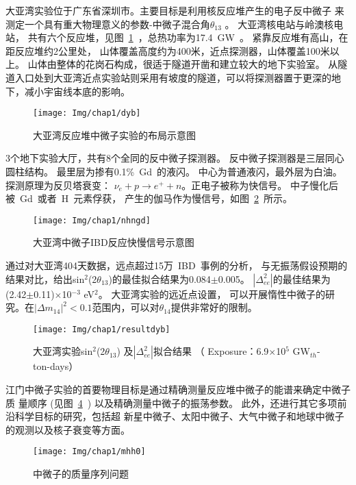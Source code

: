 大亚湾实验位于广东省深圳市。主要目标是利用核反应堆产生的电子反中微子
来测定一个具有重大物理意义的参数-中微子混合角$\theta_{13}$
\citep{pontecorvo1968neutrino,maki1962remarks}。
大亚湾核电站与岭澳核电站，
共有六个反应堆，见图~\ref{fig:dyb}~，总热功率为17.4~GW~。
紧靠反应堆有高山，在距反应堆约2公里处，
山体覆盖高度约为400米，近点探测器，山体覆盖100米以上。
山体由整体的花岗石构成，很适于隧道开凿和建立较大的地下实验室。
从隧道入口处到大亚湾近点实验站则采用有坡度的隧道，可以将探测器置于更深的地下，减小宇宙线本底的影响。
\begin{figure}[!htb]
  \centering
   \texttt{[image: Img/chap1/dyb]}
    \caption{大亚湾反应堆中微子实验的布局示意图}
  \label{fig:dyb}
\end{figure}
3个地下实验大厅，共有8个全同的反中微子探测器。
反中微子探测器是三层同心圆柱结构\citep{an2012side}。
最里层为掺有0.1\%~Gd~的液闪\citep{yeh2007gadolinium}。
中心为普通液闪，最外层为白油。探测原理为反贝塔衰变：
$\nu_e + p \rightarrow e^+ + n $。正电子被称为快信号。
中子慢化后被~Gd~\citep{an2015new}或者~H~元素\citep{an2014independent}俘获，
产生的伽马作为慢信号，如图~\ref{fig:nhngd}~所示。
\begin{figure}[!htb]
  \centering
   \texttt{[image: Img/chap1/nhngd]}
    \caption{大亚湾中微子IBD反应快慢信号示意图}
  \label{fig:nhngd}
\end{figure}
通过对大亚湾404天数据，远点超过15万~IBD~事例的分析，
与无振荡假设预期的结果对比，给出sin$^2$(2$\theta_{13}$)的最佳拟合结果为0.084$\pm$0.005。
$|\Delta^2_{ee}|$的最佳结果为 (2.42$\pm$0.11)$\times$10$^{-3}$ eV$^2$。
大亚湾实验的远近点设置，
可以开展惰性中微子的研究\citep{an2014search}。在${|\Delta m_{14}|}^2<0.1$范围内，可以对$\theta_{14}$提供非常好的限制。
\begin{figure}[!htb]
  \centering
   \texttt{[image: Img/chap1/resultdyb]}
    \caption{大亚湾实验sin$^2$(2$\theta_{13}$) 及$|\Delta^2_{ee}|$拟合结果 （ Exposure：6.9$\times$10$^5$ GW$_{th}$-ton-days） }
  \label{fig:resultdyb}
\end{figure}
江门中微子实验的首要物理目标是通过精确测量反应堆中微子的能谱来确定中微子质
量顺序\citep{magg1980neutrino} (见图~\ref{fig:mhh0}~) 以及精确测量中微子的振荡参数。
此外，还进行其它多项前沿科学目标的研究，包括超
新星中微子、太阳中微子、大气中微子和地球中微子的观测以及核子衰变等方面。
\begin{figure}[!htb]
  \centering
   \texttt{[image: Img/chap1/mhh0]}
    \caption{ 中微子的质量序列问题 }
  \label{fig:mhh0}
\end{figure}
